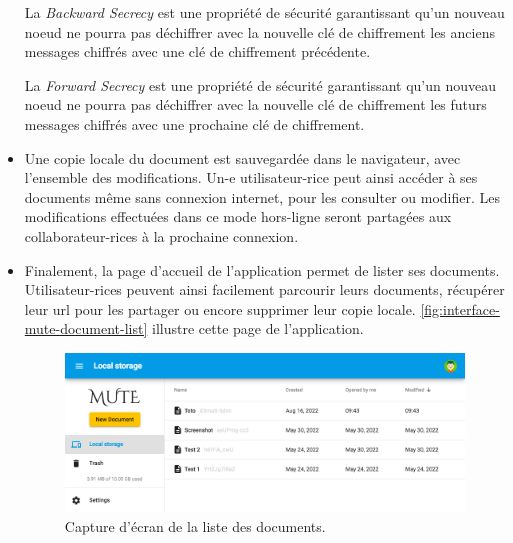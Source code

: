 \begin{itemize}
        \begin{definition}
            La \emph{Backward Secrecy} est une propriété de sécurité garantissant qu'un nouveau noeud ne pourra pas déchiffrer avec la nouvelle clé de chiffrement les anciens messages chiffrés avec une clé de chiffrement précédente.
        \end{definition}
        \begin{definition}
            La \emph{Forward Secrecy} est une propriété de sécurité garantissant qu'un nouveau noeud ne pourra pas déchiffrer avec la nouvelle clé de chiffrement les futurs messages chiffrés avec une prochaine clé de chiffrement.
        \end{definition}
    \item Une copie locale du document est sauvegardée dans le navigateur, avec l'ensemble des modifications.
        Un-e utilisateur-rice peut ainsi accéder à ses documents même sans connexion internet, pour les consulter ou modifier.
        Les modifications effectuées dans ce mode hors-ligne seront partagées aux collaborateur-rices à la prochaine connexion.
    \item Finalement, la page d'accueil de l'application permet de lister ses documents.
        Utilisateur-rices peuvent ainsi facilement parcourir leurs documents, récupérer leur url pour les partager ou encore supprimer leur copie locale.
        \autoref{fig:interface-mute-document-list} illustre cette page de l'application.
        \begin{figure}[!ht]
            \centering
            \includegraphics[width=\linewidth]{img/screenshot-mute-document-list.png}
            \caption{Capture d'écran de la liste des documents.}
            \label{fig:interface-mute-document-list}
        \end{figure}
\end{itemize}
